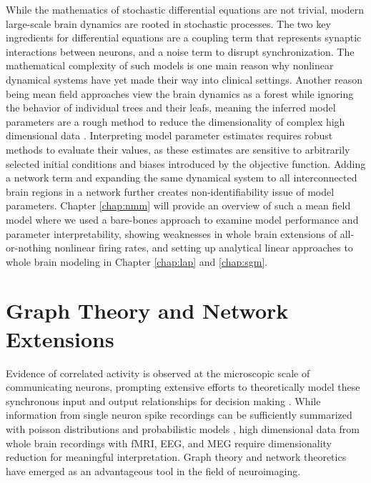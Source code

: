 While the mathematics of stochastic differential equations are not trivial, modern large-scale brain dynamics are rooted in stochastic processes. The two key ingredients for differential equations are a coupling term that represents synaptic interactions between neurons, and a noise term to disrupt synchronization. The mathematical complexity of such models is one main reason why nonlinear dynamical systems have yet made their way into clinical settings. Another reason being mean field approaches view the brain dynamics as a forest while ignoring the behavior of individual trees and their leafs, meaning the inferred model parameters are a rough method to reduce the dimensionality of complex high dimensional data \cite{huys_computational_2016}. Interpreting model parameter estimates requires robust methods to evaluate their values, as these estimates are sensitive to arbitrarily selected initial conditions and biases introduced by the objective function. Adding a network term and expanding the same dynamical system to all interconnected brain regions in a network further creates non-identifiability issue of model parameters. Chapter \ref{chap:nmm} will provide an overview of such a mean field model where we used a bare-bones approach to examine model performance and parameter interpretability, showing weaknesses in whole brain extensions of all-or-nothing nonlinear firing rates, and setting up analytical linear approaches to whole brain modeling in Chapter \ref{chap:lap} and \ref{chap:sgm}. 

\section{Graph Theory and Network Extensions}
Evidence of correlated activity is observed at the microscopic scale of communicating neurons, prompting extensive efforts to theoretically model these synchronous input and output relationships for decision making \cite{bogacz_physics_2006,hamburger_donald_1969,ratcliff_diffusion_2008,ratcliff_connectionist_1999}. While information from single neuron spike recordings can be sufficiently summarized with poisson distributions and probabilistic models \cite{smith_poisson_2010,zhang_optimal_2010}, high dimensional data from whole brain recordings with fMRI, EEG, and MEG require dimensionality reduction for meaningful interpretation. Graph theory and network theoretics have emerged as an advantageous tool in the field of neuroimaging.

